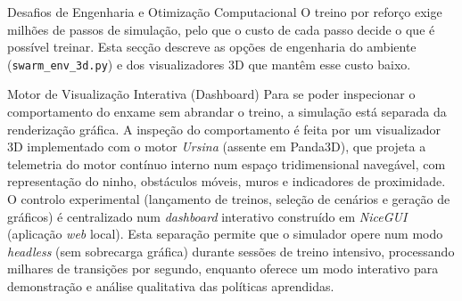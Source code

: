 \documentclass[12pt,reqno, twoside]{amsbook}
\makeatletter
\def\section{\@startsection{section}{1}%
      \z@{.5\linespacing\@plus.7\linespacing}{.25\linespacing}%
      {\normalfont\bfseries\flushleft}}
\def\subsection{\@startsection{subsection}{2}%
      \z@{.5\linespacing\@plus.7\linespacing}{.25\linespacing}%
      {\normalfont\bfseries\flushleft}}
\theoremstyle{plain}
\numberwithin{equation}{chapter}
\numberwithin{section}{chapter}
\numberwithin{table}{chapter}
\numberwithin{figure}{chapter}
\makeatother
\begin{document}
\section{Desafios de Engenharia e Otimização Computacional}
O treino por reforço exige milhões de passos de simulação, pelo que o custo de cada passo decide o que é possível treinar. Esta secção descreve as opções de engenharia do ambiente (\texttt{swarm\_env\_3d.py}) e dos visualizadores 3D que mantêm esse custo baixo.

\subsection{Motor de Visualização Interativa (Dashboard)}
Para se poder inspecionar o comportamento do enxame sem abrandar o treino, a simulação está separada da renderização gráfica.
A inspeção do comportamento é feita por um visualizador 3D implementado com o motor \emph{Ursina} (assente em Panda3D), que projeta a telemetria do motor contínuo interno num espaço tridimensional navegável, com representação do ninho, obstáculos móveis, muros e indicadores de proximidade. O controlo experimental (lançamento de treinos, seleção de cenários e geração de gráficos) é centralizado num \textit{dashboard} interativo construído em \emph{NiceGUI} (aplicação \textit{web} local). Esta separação permite que o simulador opere num modo \textit{headless} (sem sobrecarga gráfica) durante sessões de treino intensivo, processando milhares de transições por segundo, enquanto oferece um modo interativo para demonstração e análise qualitativa das políticas aprendidas.
\end{document}
